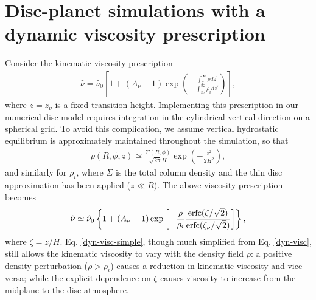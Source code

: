 \section{Disc-planet simulations with a dynamic viscosity
  prescription} 
Consider the kinematic viscosity prescription
\begin{align}\label{dyn-visc}
  \hat{\nu} = \hat{\nu}_0\left[1 + \left(A_\nu -
  1\right)\exp{\left(-\frac{\int_z^\infty\rho
        dz^\prime}{\int_{z_\nu}^\infty\rho_i dz^\prime}\right)}\right],  
\end{align}
where $z=z_\nu$ is a fixed transition height. Implementing this
prescription in our numerical disc model requires integration in the cylindrical
vertical direction on a spherical grid. To avoid this complication, we 
assume vertical hydrostatic equilibrium is approximately maintained 
throughout the simulation, so that
\begin{align}
  \rho(R,\phi, z) \simeq
  \frac{\Sigma(R,\phi)}{\sqrt{2\pi}H}\exp{\left(-\frac{z^2}{2H^2}\right)},  
\end{align}
and similarly for $\rho_i$, where $\Sigma$ is the total column
density and the thin disc approximation has been applied ($z\ll R$). 
The above viscosity prescription becomes
\begin{align}\label{dyn-visc-simple}
   \hat{\nu} \simeq \hat{\nu}_0\left\{1 + \left(A_\nu -
  1\right)\exp{\left[-\frac{\rho}{\rho_i}\frac{\operatorname{erfc}(\zeta/\sqrt{2})}{\operatorname{erfc}(\zeta_\nu/\sqrt{2})}\right]}\right\},
\end{align} 
where $\zeta = z/H$. Eq. \ref{dyn-visc-simple}, though much simplified
from  Eq. \ref{dyn-visc}, still allows the kinematic 
viscosity to vary with the density field $\rho$: a
positive density perturbation ($\rho>\rho_i$) causes a reduction in
kinematic viscosity and vice versa; while the explicit dependence on
$\zeta$ causes viscosity to increase from the midplane to the disc
atmosphere.    

